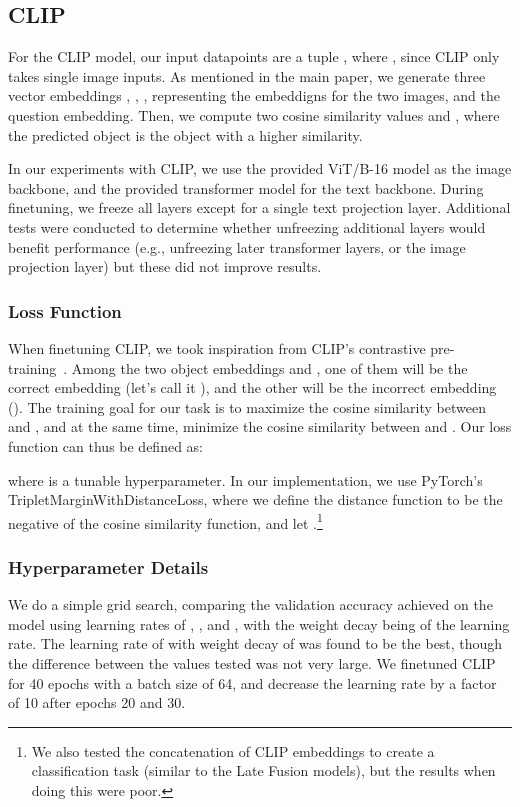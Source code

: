 \documentclass[runningheads]{llncs}
\begin{document}
\subsection{CLIP~\cite{radford2021clip}}

For the CLIP model, our input datapoints are a tuple , where , since CLIP only takes single image inputs. As mentioned in the main paper, we generate three vector embeddings , , , representing the embeddigns for the two images, and the question embedding. Then, we compute two cosine similarity values  and , where the predicted object is the object with a higher similarity.

In our experiments with CLIP, we use the provided ViT/B-16 model as the image backbone, and the provided transformer model for the text backbone. During finetuning, we freeze all layers except for a single text projection layer. Additional tests were conducted to determine whether unfreezing additional layers would benefit performance (e.g., unfreezing later transformer layers, or the image projection layer) but these did not improve results.

\subsubsection{Loss Function} When finetuning CLIP, we took inspiration from CLIP's contrastive pre-training~\cite{radford2021clip}. Among the two object embeddings  and , one of them will be the correct embedding (let's call it ), and the other will be the incorrect embedding (). The training goal for our task is to maximize the cosine similarity between  and , and at the same time, minimize the cosine similarity between  and . Our loss function can thus be defined as:


where  is a tunable hyperparameter. In our implementation, we use PyTorch's TripletMarginWithDistanceLoss, where we define the distance function to be the negative of the cosine similarity function, and let .\footnote{We also tested the concatenation of CLIP embeddings to create a classification task (similar to the Late Fusion models), but the results when doing this were poor.}

\subsubsection{Hyperparameter Details} We do a simple grid search, comparing the validation accuracy achieved on the model using learning rates of , , and , with the weight decay being  of the learning rate. The learning rate of  with weight decay of  was found to be the best, though the difference between the values tested was not very large. We finetuned CLIP for 40 epochs with a batch size of 64, and decrease the learning rate by a factor of 10 after epochs 20 and 30. 
\end{document}
